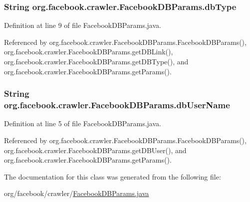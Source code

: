 \hypertarget{classorg_1_1facebook_1_1crawler_1_1_facebook_d_b_params_a080ce06d866679ccd36d9a3d445323e2}{
\subsubsection[{db\-Type}]{\setlength{\rightskip}{0pt plus 5cm}String org.\-facebook.\-crawler.\-Facebook\-D\-B\-Params.\-db\-Type\hspace{0.3cm}{\ttfamily [private]}}}\label{classorg_1_1facebook_1_1crawler_1_1_facebook_d_b_params_a080ce06d866679ccd36d9a3d445323e2}


Definition at line 9 of file Facebook\-D\-B\-Params.\-java.



Referenced by org.\-facebook.\-crawler.\-Facebook\-D\-B\-Params.\-Facebook\-D\-B\-Params(), org.\-facebook.\-crawler.\-Facebook\-D\-B\-Params.\-get\-D\-B\-Link(), org.\-facebook.\-crawler.\-Facebook\-D\-B\-Params.\-get\-D\-B\-Type(), and org.\-facebook.\-crawler.\-Facebook\-D\-B\-Params.\-get\-Params().

\hypertarget{classorg_1_1facebook_1_1crawler_1_1_facebook_d_b_params_a071310325d52d718a551589c58abd033}{
\subsubsection[{db\-User\-Name}]{\setlength{\rightskip}{0pt plus 5cm}String org.\-facebook.\-crawler.\-Facebook\-D\-B\-Params.\-db\-User\-Name\hspace{0.3cm}{\ttfamily [private]}}}\label{classorg_1_1facebook_1_1crawler_1_1_facebook_d_b_params_a071310325d52d718a551589c58abd033}


Definition at line 5 of file Facebook\-D\-B\-Params.\-java.



Referenced by org.\-facebook.\-crawler.\-Facebook\-D\-B\-Params.\-Facebook\-D\-B\-Params(), org.\-facebook.\-crawler.\-Facebook\-D\-B\-Params.\-get\-D\-B\-User(), and org.\-facebook.\-crawler.\-Facebook\-D\-B\-Params.\-get\-Params().



The documentation for this class was generated from the following file\-:\begin{DoxyCompactItemize}
\item 
org/facebook/crawler/\hyperlink{_facebook_d_b_params_8java}{Facebook\-D\-B\-Params.\-java}\end{DoxyCompactItemize}
